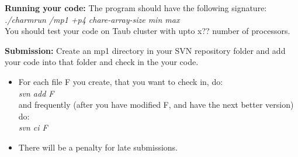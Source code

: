 \documentclass{article}
\begin{document}
\textbf{Running your code:}
The program should have the following signature:
\textit{./charmrun /mp1 +p4 chare-array-size min max} \\
You should test your code on Taub cluster with upto x?? number of processors.

\textbf{Submission:}
Create an mp1 directory in your SVN repository folder and add your code into
that folder and check in the your code.
\begin{itemize}
\item  For each file F you create, that you want to check in, do: \\
        \textit{svn add F}\\
        and frequently (after you have modified F, and have the next better
        version) do:\\ 
        \textit{svn ci F}
\item  There will be a penalty for late submissions.
\end{itemize}
\end{document}
